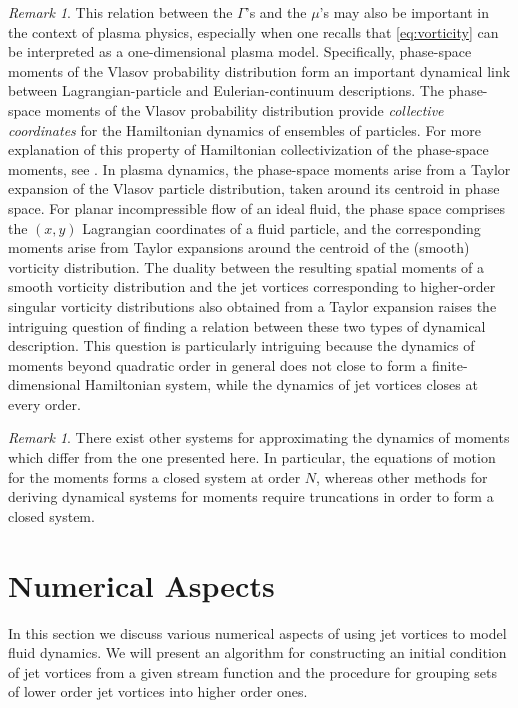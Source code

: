 \documentclass[12pt]{amsart}
\theoremstyle{remark}
\newtheorem{rmk}[thm]{Remark}
\begin{document}
	\begin{rmk}
	This relation between the $\Gamma$'s and the $\mu$'s may also be important in the context of plasma physics, especially when one recalls that \eqref{eq:vorticity} can be interpreted as a one-dimensional plasma model.
	Specifically, phase-space moments of the Vlasov probability distribution form an important  dynamical link between Lagrangian-particle and Eulerian-continuum descriptions.
The phase-space moments of the Vlasov probability distribution provide \emph{collective coordinates} for the Hamiltonian dynamics of ensembles of particles.
	For more explanation of this property of Hamiltonian collectivization of the phase-space moments, see \cite{GuilleminSternberg1990,HolmLysenkoScovel1990,GibbonsHolmTronci2008a,GibbonsHolmTronci2008b}.
	In plasma dynamics, the phase-space moments arise from a Taylor expansion of the Vlasov particle distribution, taken around its centroid in phase space. For planar incompressible flow of an ideal fluid, the phase space comprises the $(x,y)$ Lagrangian coordinates of a fluid particle, and the corresponding moments arise from Taylor expansions around the centroid of the (smooth) vorticity distribution. The duality between the resulting spatial moments of a smooth vorticity distribution and the jet vortices corresponding to higher-order singular vorticity distributions also obtained from a Taylor expansion raises the intriguing question of finding a relation between these two types of dynamical description. This question is particularly intriguing because the dynamics of moments beyond quadratic order in general does not close to form a finite-dimensional Hamiltonian system, while the dynamics of jet vortices closes at every order. 
	\end{rmk}
	
	\begin{rmk}
	There exist other systems for approximating the dynamics of moments which differ from the one presented here.
	In particular, the equations of motion for the moments forms a closed system at order $N$, whereas other methods for deriving dynamical systems for moments
	\cite{UminskyWayneBarbaro2010, NagemSandriUminskyWayne2009,GibbonsHolmTronci2008a,GibbonsHolmTronci2008b}
	require truncations in order to form a closed system.
	\end{rmk}

\section{Numerical Aspects}
\label{sec:numerics}
In this section we discuss various numerical aspects of using jet vortices to model fluid dynamics.
We will present an algorithm for constructing an initial condition of jet vortices from a given stream
function and the procedure for grouping sets of lower order jet vortices into higher order ones.
\end{document}
